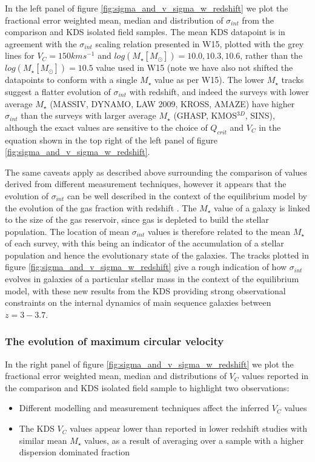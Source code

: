 \documentclass[fleqn,usenatbib]{mn2e}
\begin{document}
In the left panel of figure \ref{fig:sigma_and_v_sigma_w_redshift} we plot the fractional error weighted mean, median and distribution of $\sigma_{int}$ from the comparison and KDS isolated field samples.
The mean KDS datapoint is in agreement with the $\sigma_{int}$ scaling relation presented in W15, plotted with the grey lines for $V_{C} = 150kms^{-1}$ and $log(M_{\star}[M_{\odot}])=10.0,10.3,10.6$, rather than the $log(M_{\star}[M_{\odot}])=10.5$ value used in W15 (note we have also not shifted the datapoints to conform with a single $M_{\star}$ value as per W15).
The lower $M_{\star}$ tracks suggest a flatter evolution of $\sigma_{int}$ with redshift, and indeed the surveys with lower average $M_{\star}$ (MASSIV, DYNAMO, LAW 2009, KROSS, AMAZE) have higher $\sigma_{int}$ than the surveys with larger average $M_{\star}$ (GHASP, KMOS$^{3D}$, SINS), although the exact values are sensitive to the choice of $Q_{crit}$ and $V_{C}$ in the equation shown in the top right of the left panel of figure \ref{fig:sigma_and_v_sigma_w_redshift}.

The same caveats apply as described above surrounding the comparison of values derived from different measurement techniques, however it appears that the evolution of $\sigma_{int}$ can be well described in the context of the equilibrium model by the evolution of the gas fraction with redshift \citep{Wisnioski2015}.
The $M_{\star}$ value of a galaxy is linked to the size of the gas reservoir, since gas is depleted to build the stellar population.
The location of mean $\sigma_{int}$ values is therefore related to the mean $M_{\star}$ of each survey, with this being an indicator of the accumulation of a stellar population and hence the evolutionary state of the galaxies.
The tracks plotted in figure \ref{fig:sigma_and_v_sigma_w_redshift} give a rough indication of how $\sigma_{int}$ evolves in galaxies of a particular stellar mass in the context of the equilibrium model, with these new results from the KDS providing strong observational constraints on the internal dynamics of main sequence galaxies between $z=3-3.7$.

\subsubsection{The evolution of maximum circular velocity}\label{subsubsec:v_evolution}
In the right panel of figure \ref{fig:sigma_and_v_sigma_w_redshift} we plot the fractional error weighted mean, median and distributions of $V_{C}$ values reported in the comparison and KDS isolated field sample to highlight two observations:
\begin{itemize}
    \item Different modelling and measurement techniques affect the inferred $V_{C}$ values
    \item The KDS $V_{C}$ values appear lower than reported in lower redshift studies with similar mean $M_{\star}$ values, as a result of averaging over a sample with a higher dispersion dominated fraction
\end{itemize}
\end{document}
